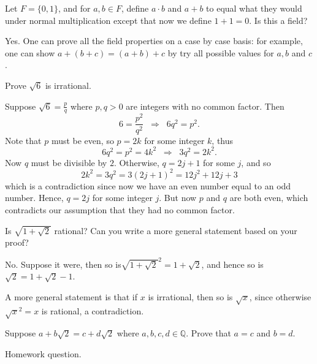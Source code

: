 \documentclass[11pt,dvipsnames]{book}
\numberwithin{figure}{section} %
\numberwithin{table}{section} %
\begin{document}
\begin{exercise}
Let $F=\{0,1\}$, and for $a,b\in F$, define $a\cdot b$ and $a+b$ to equal what they would under normal multiplication except that now we define $1+1=0$. Is this a field?
\begin{solution}
Yes. One can prove all the field properties on a case by case basis: for example, one can show $a+(b+c)=(a+b)+c$ by try all possible values for $a,b$ and $c$.
\end{solution}
\end{exercise}

\begin{exercise}
Prove $\sqrt{6}$ is irrational.
\begin{solution}
Suppose $\sqrt{6}=\frac{p}{q}$ where $p,q>0$ are integers with no common factor. Then
\[
6=\frac{p^2}{q^2} \;\; \Longrightarrow \;\;  6q^2=p^2.
\]
Note that $p$ must be even, so $p=2k$ for some integer $k$, thus
\[
6q^2=p^2=4k^2  \;\; \Longrightarrow \;\;   3q^2=2k^2.
\]
Now $q$ must be divisible by $2$. Otherwise, $q=2j+1$ for some $j$, and so
\[
2k^2=3q^2=3(2j+1)^2=12j^2+12j+3
\]
which is a contradiction since now we have an even number equal to an odd number. Hence, $q=2j$ for some integer $j$. But now $p$ and $q$ are both even, which contradicts our assumption that they had no common factor.

\end{solution}
\end{exercise}

\begin{exercise}
Is $\sqrt{1+\sqrt{2}}$ rational? Can you write a more general statement based on your proof?
\begin{solution}
No. Suppose it were, then so is$\sqrt{1+\sqrt{2}}^2=1+\sqrt{2}$, and hence so is $\sqrt{2}=1+\sqrt{2}-1$.

A more general statement is that if $x$ is irrational, then so is $\sqrt{x}$, since otherwise $\sqrt{x}^2=x$ is rational, a contradiction.
\end{solution}
\end{exercise}

\begin{exercise}
Suppose $a+b\sqrt{2}=c+d\sqrt{2}$ where $a,b,c,d\in\mathbb{Q}$. Prove that $a=c$ and $b=d$.
\begin{solution}
Homework question.
\end{solution}
\end{exercise}
\end{document}
